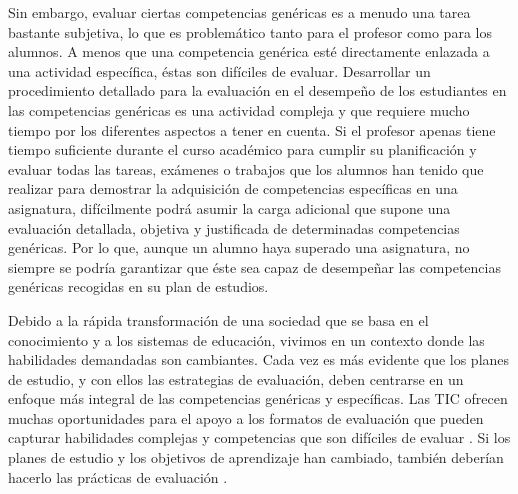 Sin embargo, evaluar ciertas competencias genéricas es a menudo una tarea bastante subjetiva, lo que es problemático tanto para el profesor como para los alumnos. A menos que una competencia genérica esté directamente enlazada a una actividad específica, éstas son difíciles de evaluar. Desarrollar un procedimiento detallado para la evaluación en el desempeño de los estudiantes en las competencias genéricas es una actividad compleja y que requiere mucho tiempo por los diferentes aspectos a tener en cuenta. Si el profesor apenas tiene tiempo suficiente durante el curso académico para cumplir su planificación y evaluar todas las tareas, exámenes o trabajos que los alumnos han tenido que realizar para demostrar la adquisición de competencias específicas en una asignatura, difícilmente podrá asumir la carga adicional que supone una evaluación detallada, objetiva y justificada de determinadas competencias genéricas. Por lo que, aunque un alumno haya superado una asignatura, no siempre se podría garantizar que éste sea capaz de desempeñar las competencias genéricas recogidas en su plan de estudios.

Debido a la rápida transformación de una sociedad que se basa en el conocimiento y a los sistemas de educación, vivimos en un contexto donde las habilidades demandadas son cambiantes. Cada vez es más evidente que los planes de estudio, y con ellos las estrategias de evaluación, deben centrarse en un enfoque más integral de las competencias genéricas y específicas. Las TIC ofrecen muchas oportunidades para el apoyo a los formatos de evaluación que pueden capturar habilidades complejas y competencias que son difíciles de evaluar \cite{Redecker:2013}. Si los planes de estudio y los objetivos de aprendizaje han cambiado, también deberían hacerlo las prácticas de evaluación \cite{Cachia:2011}.

